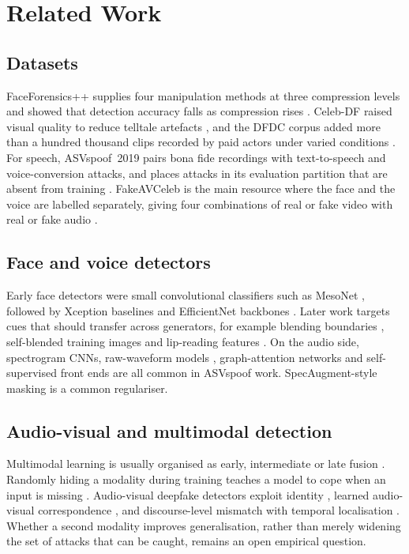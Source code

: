 \documentclass[conference]{IEEEtran}
\begin{document}
\section{Related Work}
\subsection{Datasets}
FaceForensics++ supplies four manipulation methods at three compression levels and showed that detection accuracy falls as compression rises \cite{rossler2019ff}. Celeb-DF raised visual quality to reduce telltale artefacts \cite{li2020celebdf}, and the DFDC corpus added more than a hundred thousand clips recorded by paid actors under varied conditions \cite{dolhansky2020dfdc}. For speech, ASVspoof~2019 pairs bona fide recordings with text-to-speech and voice-conversion attacks, and places attacks in its evaluation partition that are absent from training \cite{wang2020asvspoof,todisco2019asvspoof}. FakeAVCeleb is the main resource where the face and the voice are labelled separately, giving four combinations of real or fake video with real or fake audio \cite{khalid2021fakeavceleb}.

\subsection{Face and voice detectors}
Early face detectors were small convolutional classifiers such as MesoNet \cite{afchar2018meso}, followed by Xception baselines \cite{chollet2017xception} and EfficientNet backbones \cite{tan2019efficientnet}. Later work targets cues that should transfer across generators, for example blending boundaries \cite{li2020facexray}, self-blended training images \cite{shiohara2022sbi} and lip-reading features \cite{haliassos2021lips}. On the audio side, spectrogram CNNs, raw-waveform models \cite{tak2021rawnet2}, graph-attention networks \cite{jung2022aasist} and self-supervised front ends \cite{tak2022wav2vec} are all common in ASVspoof work. SpecAugment-style masking \cite{park2019specaugment} is a common regulariser.

\subsection{Audio-visual and multimodal detection}
Multimodal learning is usually organised as early, intermediate or late fusion \cite{baltrusaitis2019multimodal}. Randomly hiding a modality during training teaches a model to cope when an input is missing \cite{neverova2016moddrop}. Audio-visual deepfake detectors exploit identity \cite{cozzolino2023poi}, learned audio-visual correspondence \cite{oorloff2024avff}, and discourse-level mismatch with temporal localisation \cite{cai2022lavdf,koutlis2025dimodif}. Whether a second modality improves generalisation, rather than merely widening the set of attacks that can be caught, remains an open empirical question.
\end{document}
